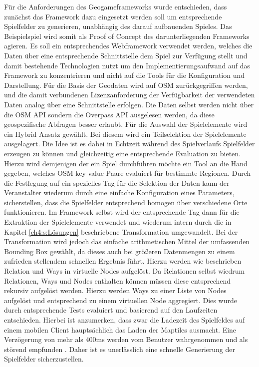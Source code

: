 Für die Anforderungen des Geogameframeworks wurde entschieden, dass zunächst das Framework dazu eingesetzt werden soll um entsprechende  Spielfelder zu generieren, unabhängig des darauf aufbauenden Spieles. Das Beispielspiel wird somit als Proof of Concept des darunterliegenden Frameworks agieren. Es soll ein entsprechendes Webframework verwendet werden, welches die Daten über eine entsprechende Schnittstelle dem Spiel zur Verfügung stellt und damit bestehende Technologien nutzt um den Implementierungsaufwand auf das Framework zu konzentrieren und nicht auf die Tools für die Konfiguration und Darstellung. Für die Basis der Geodaten wird auf OSM zurückgegriffen werden, und die damit verbundenen Lizenzanforderung der Verfügbarkeit der verwendeten Daten analog über eine Schnittstelle erfolgen. Die Daten selbst werden nicht über die OSM API sondern die Overpass API ausgelesen werden, da diese geospezifische Abfragen besser erlaubt.
Für die Auswahl der Spielelemente wird ein Hybrid Ansatz gewählt. Bei diesem wird ein Teilselektion der Spielelemente ausgelagert.
Die Idee ist es dabei in Echtzeit während des Spielverlaufs Spielfelder erzeugen zu können und gleichzeitig eine entsprechende Evaluation zu bieten. Hierzu wird demjenigen der ein Spiel durchführen möchte ein Tool an die Hand gegeben, welches OSM key-value Paare evaluiert für bestimmte Regionen. Durch die Festlegung auf ein spezielles Tag für die Selektion der Daten kann der Veranstalter wiederum durch eine einfache Konfiguration eines Parameters, sicherstellen, dass die Spielfelder entsprechend homogen über verschiedene Orte funktionieren. Im Framework selbst wird der entsprechende Tag dann für die Extraktion der Spielelemente verwendet und wiederum intern durch die in Kapitel \ref{ch4:s:Lösungen} beschriebene Transformation umgewandelt. Bei der Transformation wird jedoch das einfache arithmetischen Mittel der umfassenden Bounding Box gewählt, da dieses auch bei größeren Datenmengen zu einem zufrieden stellendem schnellen Ergebnis führt. Hierzu werden wie beschrieben Relation und Ways in virtuelle Nodes aufgelöst. Da Relationen selbst wiedrum Relationen, Ways und Nodes enthalten können müssen diese entsprechend rekursiv aufgelöst werden. Hierzu werden Ways zu einer Liste von Nodes aufgelöst und entsprechend zu einem virtuellen Node aggregiert. Dies wurde durch entsprechende Tests evaluiert und basierend auf den Laufzeiten entschieden. Hierbei ist anzumerken, dass zwar die Ladezeit des Spielfeldes auf einem mobilen Client hauptsächlich das Laden der Maptiles ausmacht. Eine Verzögerung von mehr als 400ms werden vom Benutzer wahrgenommen und als störend empfunden \cite{Gutwin.2004}. Daher ist es unerlässlich eine schnelle Generierung der Spielfelder sicherzustellen.
